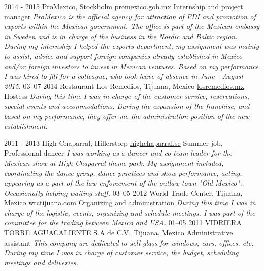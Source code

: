 \documentclass[]{friggeri-cv}
\begin{document}
\begin{entrylist}
  \bigentry
    {2014 - 2015}
    {ProMexico, Stockholm \newline 
        {\href{http://www.promexico.gob.mx/en/mx/stockholm}{promexico.gob.mx}}
    }
    {Internship and project manager}
    {\emph{ProMexico is the official agency
    for attraction of FDI and promotion of exports within the Mexican government. The office is
    part of the Mexican embassy in Sweden and is in charge of the business in the Nordic and Baltic region. 
    During my internship I helped the exports 
    department, my assignment was mainly to assist, advice and 
    support foreign companies already established in Mexico and/or
    foreign investors to invest in Mexican ventures.
    }
    }
    {\textit{ Based on my performance I was hired to fill for a colleague, who took
    leave of absence in June - August 2015.}}
  \bigentry
    {03–07 2014}
    {Restaurant Los Remedios, Tijuana, Mexico \newline
        {\href{http://www.losremedios.mx/}{losremedios.mx}}
    }
    {Hostess}
    {\emph{During this time I was in charge of the customer service,
    reservations, special events and accommodations.}}
    {\textit{ During the expansion of the franchise, and based on my 
    performance, they offer me the administration position of the 
    new establishment.}}

  \entry
    {2011 - 2013}
    {High Chaparral, Hillerstorp \newline
        {\href{http://www.highchaparral.se/sv/}{highchaparral.se}}
    }
    {Summer job, Professional dancer}
    {\emph{I was working as a dancer and co-team leader for the Mexican show at High Chaparral
    theme park. My assignment included, coordinating the dance group, dance practices and show
    performance, acting, appearing as a part of the law enforcement of the outlaw town
    "Old Mexico", Occasionally helping waiting staff.}}
  \entry
    {03–05 2012}
    {World Trade Center, Tijuana, Mexico \newline
        {\href{http://www.wtctijuana.com/}{wtctijuana.com}}
    }
    {Organizing and administration}
    {\emph{During this time I was in charge of the logistic, 
    events, organizing and schedule meetings.
    I was part of the committee for the trading between
    Mexico and USA.}}
  \entry
    {01–05 2011}
    {VIDRIERA TORRE AGUACALIENTE S.A de C.V, Tijuana, Mexico}
    {Administrative assistant}
    {\emph{This company are dedicated to sell glass for windows, cars, 
    offices, etc. During my time I was in charge of customer 
    service, the budget, scheduling meetings and deliveries.}}
\end{entrylist}
\end{document}
